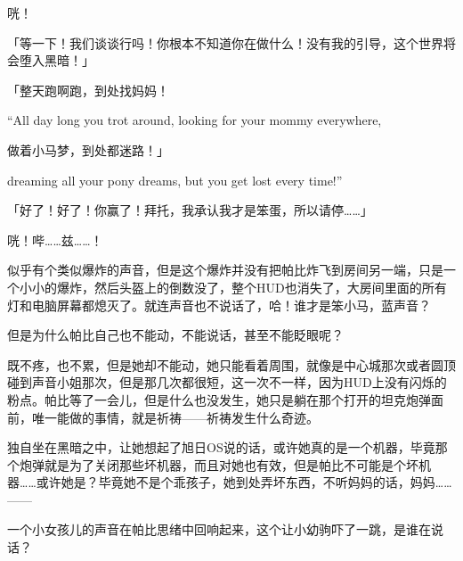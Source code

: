 咣！

「等一下！我们谈谈行吗！你根本不知道你在做什么！没有我的引导，这个世界将会堕入黑暗！」

\begin{song}
「整天跑啊跑，到处找妈妈！


\begin{englishlyric}
    ``All day long you trot around, looking for your mommy everywhere,
\end{englishlyric}

\medskip

做着小马梦，到处都迷路！」


\begin{englishlyric}
    dreaming all your pony dreams, but you get lost every time!''
\end{englishlyric}
\end{song}

「好了！好了！你赢了！拜托，我承认我才是笨蛋，所以请停……」

咣！哔……兹……！

似乎有个类似爆炸的声音，但是这个爆炸并没有把帕比炸飞到房间另一端，只是一个小小的爆炸，然后头盔上的倒数没了，整个HUD也消失了，大房间里面的所有灯和电脑屏幕都熄灭了。就连声音也不说话了，哈！谁才是笨小马，蓝声音？

但是为什么帕比自己也不能动，不能说话，甚至不能眨眼呢？

既不疼，也不累，但是她却不能动，她只能看着周围，就像是中心城那次或者圆顶碰到声音小姐那次，但是那几次都很短，这一次不一样，因为HUD上没有闪烁的粉点。帕比等了一会儿，但是什么也没发生，她只是躺在那个打开的坦克炮弹面前，唯一能做的事情，就是祈祷——祈祷发生什么奇迹。

独自坐在黑暗之中，让她想起了旭日OS说的话，或许她真的是一个机器，毕竟那个炮弹就是为了关闭那些坏机器，而且对她也有效，但是帕比不可能是个坏机器……或许她是？毕竟她不是个乖孩子，她到处弄坏东西，不听妈妈的话，妈妈……——



一个小女孩儿的声音在帕比思绪中回响起来，这个让小幼驹吓了一跳，是谁在说话？


